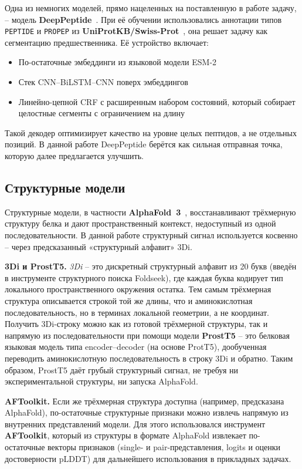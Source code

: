 \documentclass{article}
\begin{document}
Одна из немногих моделей, прямо нацеленных на поставленную в работе задачу, -- модель \textbf{DeepPeptide}~\cite{deeppeptide2023}. При её обучении использовались аннотации типов \texttt{PEPTIDE} и \texttt{PROPEP} из \textbf{UniProtKB/Swiss-Prot}~\cite{uniprot2025}, она решает задачу как сегментацию предшественника. Её устройство включает:
\begin{itemize}
  \item По-остаточные эмбеддинги из языковой модели ESM-2~\cite{esm2_2019}
  \item Стек CNN--BiLSTM--CNN поверх эмбеддингов
  \item Линейно-цепной CRF с расширенным набором состояний, который собирает целостные сегменты с ограничением на длину
\end{itemize}
Такой декодер оптимизирует качество на уровне целых пептидов, а не отдельных позиций. В данной работе DeepPeptide берётся как сильная отправная точка, которую далее предлагается улучшить.

\subsection{Структурные модели}
Структурные модели, в частности \textbf{AlphaFold~3}~\cite{alphafold3_2024}, восстанавливают трёхмерную структуру белка и дают пространственный контекст, недоступный из одной последовательности. В данной работе структурный сигнал используется косвенно -- через предсказанный «структурный алфавит» 3Di.

\textbf{3Di и ProstT5.} \emph{3Di} -- это дискретный структурный алфавит из 20 букв (введён в инструменте структурного поиска Foldseek), где каждая буква кодирует тип локального пространственного окружения остатка. Тем самым трёхмерная структура описывается строкой той же длины, что и аминокислотная последовательность, но в терминах локальной геометрии, а не координат. Получить 3Di-строку можно как из готовой трёхмерной структуры, так и напрямую из последовательности при помощи модели \textbf{ProstT5} -- это белковая языковая модель типа encoder--decoder (на основе ProtT5), дообученная переводить аминокислотную последовательность в строку 3Di и обратно. Таким образом, ProstT5 даёт грубый структурный сигнал, не требуя ни экспериментальной структуры, ни запуска AlphaFold.

\textbf{AFToolkit.} Если же трёхмерная структура доступна (например, предсказана AlphaFold), по-остаточные структурные признаки можно извлечь напрямую из внутренних представлений модели. Для этого использовался инструмент \textbf{AFToolkit}, который из структуры в формате AlphaFold извлекает по-остаточные векторы признаков (single- и pair-представления, logits и оценки достоверности pLDDT) для дальнейшего использования в прикладных задачах.
\end{document}
